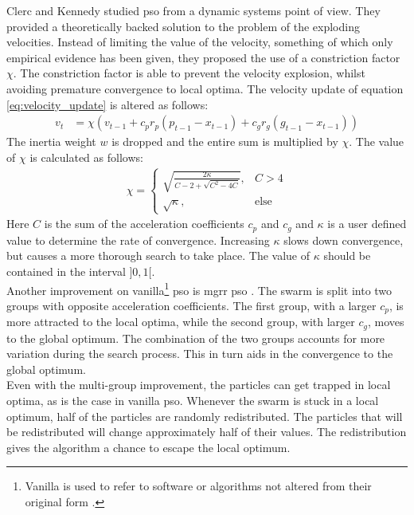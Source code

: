 Clerc and Kennedy \cite{constriction_factor} studied \gls{pso} from a dynamic systems point of view. They provided a theoretically backed solution to the problem of the exploding velocities. Instead of limiting the value of the velocity, something of which only empirical evidence has been given, they proposed the use of a constriction factor $\chi$. The constriction factor is able to prevent the velocity explosion, whilst avoiding premature convergence to local optima. The velocity update of equation \ref{eq:velocity_update} is altered as follows:
\begin{align*}
	v_{t} &= \chi (v_{t-1} + c_pr_p(p_{t-1} - x_{t-1}) + c_gr_g(g_{t-1} - x_{t-1}))
\end{align*}
The inertia weight $w$ is dropped and the entire sum is multiplied by $\chi$. The value of $\chi$ is calculated as follows:
\begin{align*}
	\chi = 
	\begin{cases}
		\sqrt{\frac{2\kappa}{C-2+\sqrt{C^2-4C}}}, &C>4\\
		\sqrt{\kappa}, 							&\text{else}
	\end{cases}
\end{align*}
Here $C$ is the sum of the acceleration coefficients $c_p$ and $c_g$ and $\kappa$ is a user defined value to determine the rate of convergence. Increasing $\kappa$ slows down convergence, but causes a more thorough search to take place. The value of $\kappa$ should be contained in the interval $]0, 1[$.\\ 

Another improvement on vanilla\footnote{Vanilla is used to refer to software or algorithms not altered from their original form \cite{vanilla}.} \gls{pso} is \gls{mgrr} \gls{pso} \cite{opposite_cs}. The swarm is split into two groups with opposite acceleration coefficients. The first group, with a larger $c_p$, is more attracted to the local optima, while the second group, with larger $c_g$, moves to the global optimum. The combination of the two groups accounts for more variation during the search process. This in turn aids in the convergence to the global optimum.\\ 

Even with the multi-group improvement, the particles can get trapped in local optima, as is the case in vanilla \gls{pso}. Whenever the swarm is stuck in a local optimum, half of the particles are randomly redistributed. The particles that will be redistributed will change approximately half of their values. The redistribution gives the algorithm a chance to escape the local optimum.\\
 

